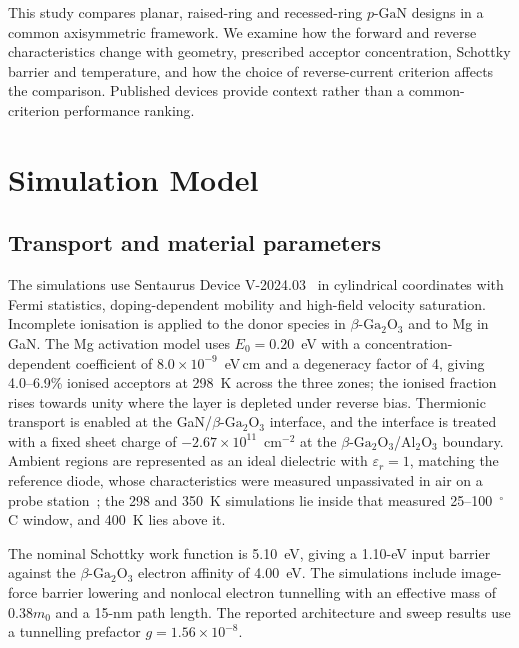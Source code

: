 \documentclass[journal,10pt]{IEEEtran}
\newcommand{\GaO}{\ensuremath{\beta\text{-}\mathrm{Ga}_2\mathrm{O}_3}}
\newcommand{\pGaN}{\ensuremath{p\text{-}\mathrm{GaN}}}
\begin{document}
This study compares planar, raised-ring and recessed-ring \pGaN{} designs in a common axisymmetric framework. We examine how the forward and reverse characteristics change with geometry, prescribed acceptor concentration, Schottky barrier and temperature, and how the choice of reverse-current criterion affects the comparison. Published devices provide context rather than a common-criterion performance ranking.

\section{Simulation Model}
\subsection{Transport and material parameters}
The simulations use Sentaurus Device V-2024.03~\cite{Sentaurus2024} in cylindrical coordinates with Fermi statistics, doping-dependent mobility and high-field velocity saturation. Incomplete ionisation is applied to the donor species in \GaO{} and to Mg in GaN. The Mg activation model uses $E_0=0.20$~eV with a concentration-dependent coefficient of $8.0\times10^{-9}$~eV\,cm and a degeneracy factor of 4, giving 4.0--6.9\% ionised acceptors at 298~K across the three zones; the ionised fraction rises towards unity where the layer is depleted under reverse bias. Thermionic transport is enabled at the GaN/\GaO{} interface, and the interface is treated with a fixed sheet charge of $-2.67\times10^{11}$~cm$^{-2}$ at the \GaO/Al$_2$O$_3$ boundary. Ambient regions are represented as an ideal dielectric with $\varepsilon_r=1$, matching the reference diode, whose characteristics were measured unpassivated in air on a probe station~\cite{Yang2017}; the 298 and 350~K simulations lie inside that measured 25--100~$^\circ$C window, and 400~K lies above it.

The nominal Schottky work function is 5.10~eV, giving a 1.10-eV input barrier against the \GaO{} electron affinity of 4.00~eV. The simulations include image-force barrier lowering and nonlocal electron tunnelling with an effective mass of $0.38m_0$ and a 15-nm path length. The reported architecture and sweep results use a tunnelling prefactor $g=1.56\times10^{-8}$.
\end{document}
